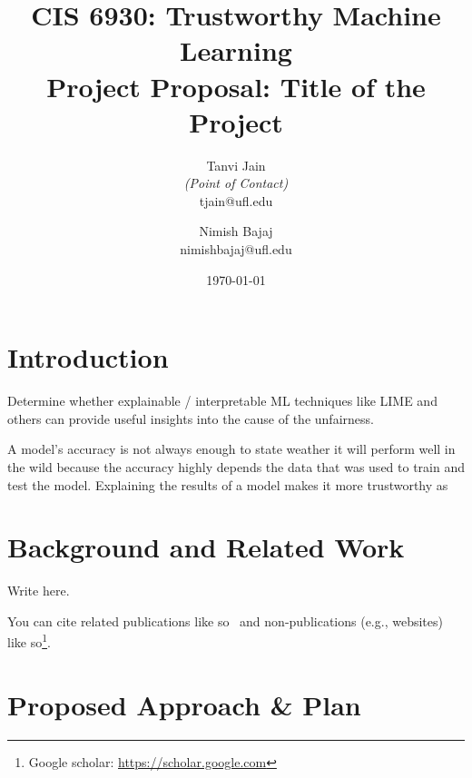 \documentclass[11pt,letterpaper]{article}
\title{CIS 6930: Trustworthy Machine Learning\\
	\Large Project Proposal: Title of the Project} %
\author{
        Tanvi Jain \\{\em (Point of Contact)} \\
        tjain@ufl.edu\\
        \and
        Nimish Bajaj \\
        nimishbajaj@ufl.edu\\
}
\date{\today}
\begin{document}

\maketitle




\section{Introduction}


Determine whether explainable / interpretable ML techniques like LIME and others can provide useful insights into the cause of the unfairness.

A model's accuracy is not always enough to state weather it will perform well in the wild because the accuracy highly depends the data that was used to train and test the model. 
Explaining the results of a model makes it more trustworthy as 

\section{Background and Related Work}

Write here.

You can cite related publications like so~\cite{vapnik1994measuring} and non-publications (e.g., websites) like so\footnote{Google scholar: \url{https://scholar.google.com}}.


\section{Proposed Approach \& Plan}
\end{document}
